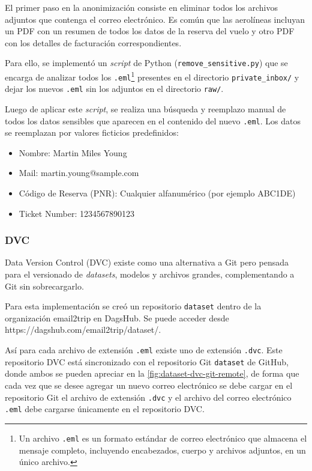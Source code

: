 El primer paso en la anonimización consiste en eliminar todos los archivos adjuntos que contenga el correo electrónico.
Es común que las aerolíneas incluyan un PDF con un resumen de todos los datos de la reserva del vuelo y otro PDF con los
detalles de facturación correspondientes.

Para ello, se implementó un \textit{script} de Python (\texttt{remove\_sensitive.py}) que se encarga de analizar todos
los \texttt{.eml}\footnote{Un archivo \texttt{.eml} es un formato estándar de correo electrónico que almacena el mensaje
completo, incluyendo encabezados, cuerpo y archivos adjuntos, en un único archivo.} presentes en el directorio
\texttt{private\_inbox/} y dejar los nuevos \texttt{.eml} sin los adjuntos en el directorio \texttt{raw/}.

Luego de aplicar este \textit{script}, se realiza una búsqueda y reemplazo manual de todos los datos sensibles que
aparecen en el contenido del nuevo \texttt{.eml}.
Los datos se reemplazan por valores ficticios predefinidos:

\begin{itemize}
    \item Nombre: Martin Miles Young
    \item Mail: martin.young@sample.com
    \item Código de Reserva (PNR): Cualquier alfanumérico (por ejemplo ABC1DE)
    \item Ticket Number: 1234567890123
\end{itemize}

\subsubsection{DVC}

Data Version Control (DVC) existe como una alternativa a Git pero pensada para el versionado de \textit{datasets},
modelos y archivos grandes, complementando a Git sin sobrecargarlo.

Para esta implementación se creó un repositorio \texttt{dataset} dentro de la organización email2trip en DagsHub.
Se puede acceder desde https://dagshub.com/email2trip/dataset/.

Así para cada archivo de extensión \texttt{.eml} existe uno de extensión \texttt{.dvc}.
Este repositorio DVC está sincronizado con el repositorio Git \texttt{dataset} de GitHub, donde ambos se pueden apreciar
en la \autoref{fig:dataset-dvc-git-remote}, de forma que cada vez que se desee agregar un nuevo correo electrónico se
debe cargar en el repositorio Git el archivo de extensión \texttt{.dvc} y el archivo del correo electrónico
\texttt{.eml} debe cargarse únicamente en el repositorio DVC\@.

